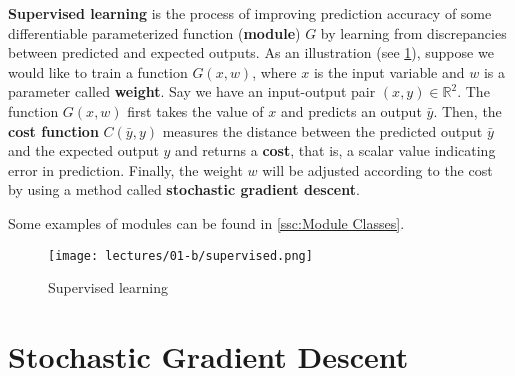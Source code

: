 \textbf{Supervised learning} is the process of improving prediction accuracy of some differentiable parameterized function (\textbf{module}) $G$ by learning from discrepancies between predicted and expected outputs.
As an illustration (see \cref{fig:supervised}), suppose we would like to train a function $G(x,w)$, where $x$ is the input variable and $w$ is a parameter called \textbf{weight}.
Say we have an input-output pair $(x,y)\in \mathbb{R}^2$.
The function $G(x,w)$ first takes the value of $x$ and predicts an output $\bar{y}$.
Then, the \textbf{cost function} $C(\bar{y},y)$ measures the distance between the predicted output $\bar{y}$ and the expected output $y$ and returns a \textbf{cost}, that is, a scalar value indicating error in prediction.
Finally, the weight $w$ will be adjusted according to the cost by using a method called \textbf{stochastic gradient descent}.

Some examples of modules can be found in \cref{ssc:Module Classes}.

\begin{figure}[ht]
\centering
\texttt{[image: lectures/01-b/supervised.png]}
\caption{Supervised learning}
\label{fig:supervised}
\end{figure}

\section{Stochastic Gradient Descent}\label{sec: SGD}

